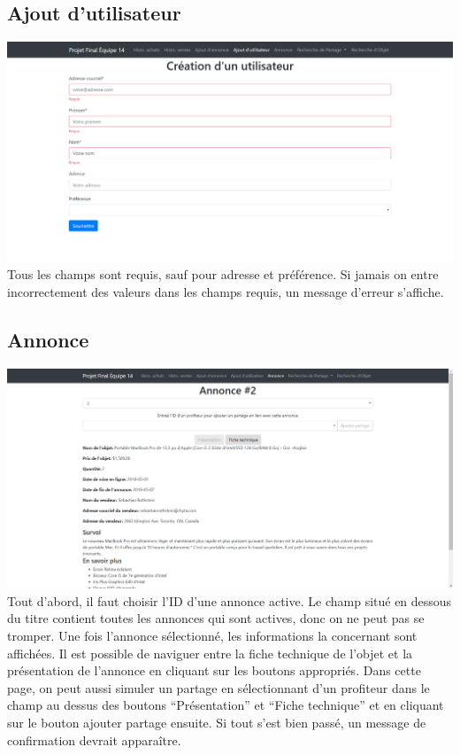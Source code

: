 \documentclass[a4paper,12pt]{article}
\begin{document}
\begin{spacing}{1}
    \subsection*{Ajout d'utilisateur}
    \includegraphics[scale=0.4]{creation_utilisateur.png}
Tous les champs sont requis, sauf pour adresse et préférence. Si jamais on entre incorrectement des valeurs dans les champs requis, un message d'erreur s'affiche.

    \subsection*{Annonce}
    \includegraphics[scale=0.4]{annonce.png}
Tout d'abord, il faut choisir l'ID d'une annonce active. Le champ situé en dessous du titre contient toutes les annonces qui sont actives, donc on ne peut pas se tromper. Une fois l'annonce sélectionné, les informations la concernant sont affichées. Il est possible de naviguer entre la fiche technique de l'objet et la présentation de l'annonce en cliquant sur les boutons appropriés.	
Dans cette page, on peut aussi simuler un partage en sélectionnant d'un profiteur dans le champ au dessus des boutons ``Présentation'' et ``Fiche technique'' et en cliquant sur le bouton ajouter partage ensuite. Si tout s'est bien passé, un message de confirmation devrait apparaître.


\end{spacing}
\end{document}
